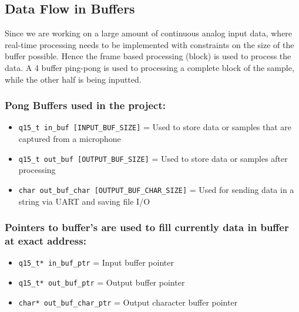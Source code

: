 \documentclass[11pt]{article}
\begin{document}
\subsection{Data Flow in Buffers}
\label{sec:org88664c6}
Since we are working on a large amount of continuous analog input data, where real-time processing needs to be implemented with constraints on the size of the buffer possible. Hence the frame based processing (block) is used to process the data. A 4 buffer ping-pong is used to processing a complete block of the sample, while the other half is being inputted.

\subsubsection*{Pong Buffers used in the project:}
\label{sec:orgb3ced5a}

\begin{itemize}
\item \texttt{q15\_t in\_buf [INPUT\_BUF\_SIZE]} = Used to store data or samples that are captured from a microphone
\item \texttt{q15\_t out\_buf [OUTPUT\_BUF\_SIZE]} = Used to store data or samples after processing
\item \texttt{char out\_buf\_char [OUTPUT\_BUF\_CHAR\_SIZE]} = Used for sending data in a string via UART and saving file I/O
\end{itemize}

\subsubsection*{Pointers to buffer's are used to fill currently data in buffer at exact address:}
\label{sec:org652f3a4}

\begin{itemize}
\item \texttt{q15\_t* in\_buf\_ptr} = Input buffer pointer
\item \texttt{q15\_t* out\_buf\_ptr} = Output buffer pointer
\item \texttt{char* out\_buf\_char\_ptr} = Output character buffer pointer
\end{itemize}
\end{document}
